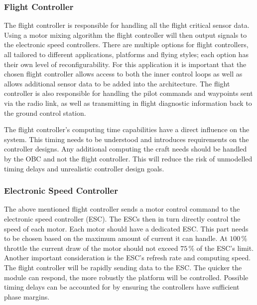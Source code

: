 			\subsubsection{Flight Controller}
			The flight controller is responsible for handling all the flight critical sensor data. Using a motor mixing algorithm the flight controller will then output signals to the electronic speed controllers. There are multiple options for flight controllers, all tailored to different applications, platforms and flying styles; each option has their own level of reconfigurability. For this application it is important that the chosen flight controller allows access to both the inner control loops as well as allows additional sensor data to be added into the architecture. The flight controller is also responsible for handling the pilot commands and waypoints sent via the radio link, as well as transmitting in flight diagnostic information back to the ground control station.
			
			The flight controller's computing time capabilities have a direct influence on the system. This timing needs to be understood and introduces requirements on the controller designs. Any additional computing the craft needs should be handled by the OBC and not the flight controller. This will reduce the risk of unmodelled timing delays and unrealistic controller design goals.
			
			\subsubsection{Electronic Speed Controller}
			The above mentioned flight controller sends a motor control command to the electronic speed controller (ESC). The ESCs then in turn directly control the speed of each motor. Each motor should have a dedicated ESC. This part needs to be chosen based on the maximum amount of current it can handle. At $100$\,\% throttle the current draw of the motor should not exceed $75$\,\% of the ESC's limit. Another important consideration is the ESC's refresh rate and computing speed. The flight controller will be rapidly sending data to the ESC. The quicker the module can respond, the more robustly the platform will be controlled. Possible timing delays can be accounted for by ensuring the controllers have sufficient phase margins. 
			
